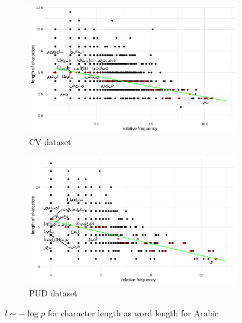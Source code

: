 \begin{figure}[H]
  \centering
  \begin{subfigure}[b]{0.48\textwidth}
    \centering
    \includegraphics[width=\textwidth]{plots/Arabic_logp_cl_CV.pdf}
    \caption{CV dataset}
  \end{subfigure}
  \hfill
  \begin{subfigure}[b]{0.48\textwidth}
    \centering
    \includegraphics[width=\textwidth]{plots/Arabic_logp_cl_PUD.pdf}
    \caption{PUD dataset}
  \end{subfigure}
  \caption{$l \sim -\log p$ for character length as word length for Arabic}
\end{figure}
